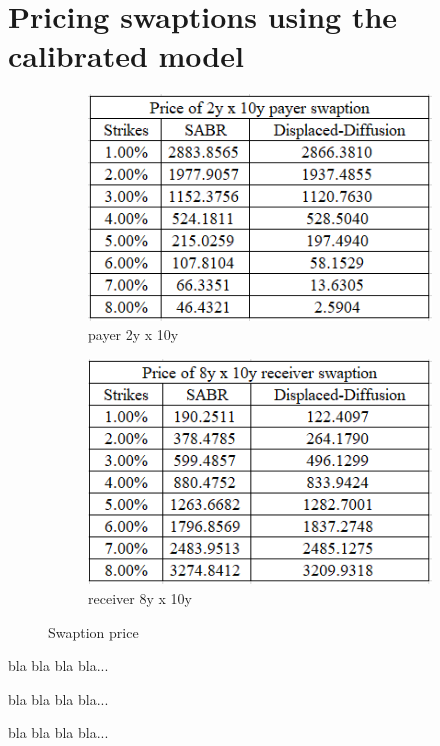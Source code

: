 \documentclass{article}
\begin{document}
\section{Pricing swaptions using the calibrated model}
\begin{figure}[h]
	\centering
	\begin{subfigure}{.5\textwidth}
		\centering
		\includegraphics[width=0.9\linewidth]{./images/Payer.png}
		\caption{payer 2y x 10y}
		\label{fig:sub1}
	\end{subfigure}%
	\begin{subfigure}{.5\textwidth}
		\centering
		\includegraphics[width=0.91\linewidth]{./images/Receiver.png}
		\caption{receiver 8y x 10y}
		\label{fig:sub2}
	\end{subfigure}
	\caption{Swaption price}
	\label{fig:test}
\end{figure}

bla bla bla bla...

bla bla bla bla...

bla bla bla bla...
\end{document}
